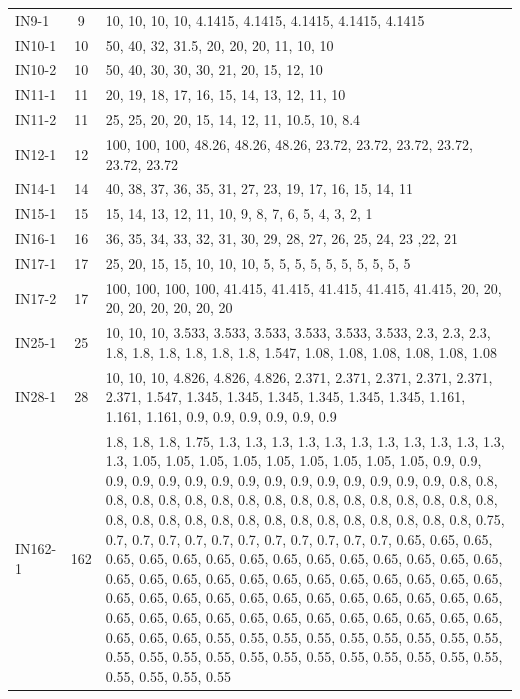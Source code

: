 \documentclass[12pt,a4paper,oneside]{book}
\begin{document}
{\begin{tabularx}{\textwidth}{ l c X }
IN9-1 & 9 & 10, 10, 10, 10, 4.1415, 4.1415, 4.1415, 4.1415, 4.1415 \\
IN10-1 & 10 & 50, 40, 32, 31.5, 20, 20, 20, 11, 10, 10 \\
IN10-2 & 10 & 50, 40, 30, 30, 30, 21, 20, 15, 12, 10 \\
IN11-1 & 11 & 20, 19, 18, 17, 16, 15, 14, 13, 12, 11, 10 \\
IN11-2 & 11 & 25, 25, 20, 20, 15, 14, 12, 11, 10.5, 10, 8.4 \\
IN12-1 & 12 & 100, 100, 100, 48.26, 48.26, 48.26, 23.72, 23.72, 23.72, 23.72, 23.72, 23.72 \\
IN14-1 & 14 & 40, 38, 37, 36, 35, 31, 27, 23, 19, 17, 16, 15, 14, 11 \\
IN15-1 & 15 & 15, 14, 13, 12, 11, 10, 9, 8, 7, 6, 5, 4, 3, 2, 1 \\
IN16-1 & 16 & 36, 35, 34, 33, 32, 31, 30, 29, 28, 27, 26, 25, 24, 23 ,22, 21 \\
IN17-1 & 17 & 25, 20, 15, 15, 10, 10, 10, 5, 5, 5, 5, 5, 5, 5, 5, 5, 5 \\
IN17-2 & 17 & 100, 100, 100, 100, 41.415, 41.415, 41.415, 41.415, 41.415, 20, 20, 20, 20, 20, 20, 20, 20 \\
IN25-1 & 25 & 10, 10, 10, 3.533, 3.533, 3.533, 3.533, 3.533, 3.533, 2.3, 2.3, 2.3, 1.8, 1.8, 1.8, 1.8, 1.8, 1.8, 1.547, 1.08, 1.08, 1.08, 1.08, 1.08, 1.08 \\
IN28-1 & 28 & 10, 10, 10, 4.826, 4.826, 4.826, 2.371, 2.371, 2.371, 2.371, 2.371, 2.371, 1.547, 1.345, 1.345, 1.345, 1.345, 1.345, 1.345, 1.161, 1.161, 1.161, 0.9, 0.9, 0.9, 0.9, 0.9, 0.9  \\
IN162-1 & 162 & 1.8, 1.8, 1.8, 1.75, 1.3, 1.3, 1.3, 1.3, 1.3, 1.3, 1.3, 1.3, 1.3, 1.3, 1.3, 1.3, 1.05, 1.05, 1.05, 1.05, 1.05, 1.05, 1.05, 1.05, 1.05, 0.9, 0.9, 0.9, 0.9, 0.9, 0.9, 0.9, 0.9, 0.9, 0.9, 0.9, 0.9, 0.9, 0.9, 0.9, 0.8, 0.8, 0.8, 0.8, 0.8, 0.8, 0.8, 0.8, 0.8, 0.8, 0.8, 0.8, 0.8, 0.8, 0.8, 0.8, 0.8, 0.8, 0.8, 0.8, 0.8, 0.8, 0.8, 0.8, 0.8, 0.8, 0.8, 0.8, 0.8, 0.8, 0.8, 0.75, 0.7, 0.7, 0.7, 0.7, 0.7, 0.7, 0.7, 0.7, 0.7, 0.7, 0.7, 0.65, 0.65, 0.65, 0.65, 0.65, 0.65, 0.65, 0.65, 0.65, 0.65, 0.65, 0.65, 0.65, 0.65, 0.65, 0.65, 0.65, 0.65, 0.65, 0.65, 0.65, 0.65, 0.65, 0.65, 0.65, 0.65, 0.65, 0.65, 0.65, 0.65, 0.65, 0.65, 0.65, 0.65, 0.65, 0.65, 0.65, 0.65, 0.65, 0.65, 0.65, 0.65, 0.65, 0.65, 0.65, 0.65, 0.65, 0.65, 0.65, 0.65, 0.65, 0.65, 0.65, 0.65, 0.55, 0.55, 0.55, 0.55, 0.55, 0.55, 0.55, 0.55, 0.55, 0.55, 0.55, 0.55, 0.55, 0.55, 0.55, 0.55, 0.55, 0.55, 0.55, 0.55, 0.55, 0.55, 0.55, 0.55, 0.55 \\
\bottomrule
\end{tabularx}

}
\end{document}
